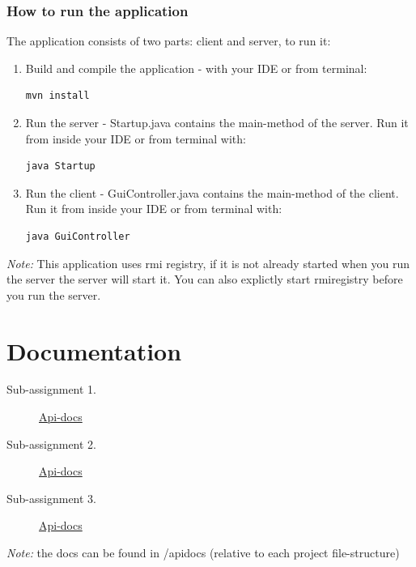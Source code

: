 \documentclass[a4paper, 11pt]{article}
\begin{document}
\subsubsection{How to run the application}
The application consists of two parts: client and server, to run it:
\begin{enumerate}
\item Build and compile the application - with your IDE or from terminal:
\begin{verbatim}
mvn install
\end{verbatim}
\item Run the server - Startup.java contains the main-method of the server. Run it from inside your IDE or from terminal with: 
\begin{verbatim}
java Startup
\end{verbatim}
\item Run the client - GuiController.java contains the main-method of the client. Run it from inside your IDE or from terminal with: 
\begin{verbatim}
java GuiController
\end{verbatim}
\end{enumerate}
\textit{Note:} This application uses rmi registry, if it is not already started when you run the server the server will start it. You can also explictly start rmiregistry before you run the server.
\newpage
\section{Documentation}
\begin{description}
\item[Sub-assignment 1.] \href{./../ID2212project_assignment1/apidocs/index.html}{Api-docs} 
\item[Sub-assignment 2.] \href{./../ID2212project_assignment2/apidocs/index.html}{Api-docs}
\item[Sub-assignment 3.] \href{./../ID2212project_assignment3/apidocs/index.html}{Api-docs}
\end{description}
\textit{Note:} the docs can be found in /apidocs (relative to each project file-structure)
\newpage
\nocite{*}


\end{document}
